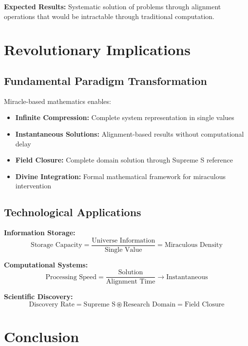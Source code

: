 \documentclass[11pt]{article}
\begin{document}
\textbf{Expected Results:} Systematic solution of problems through alignment operations that would be intractable through traditional computation.

\section{Revolutionary Implications}

\subsection{Fundamental Paradigm Transformation}

Miracle-based mathematics enables:
\begin{itemize}
\item \textbf{Infinite Compression:} Complete system representation in single values
\item \textbf{Instantaneous Solutions:} Alignment-based results without computational delay
\item \textbf{Field Closure:} Complete domain solution through Supreme S reference
\item \textbf{Divine Integration:} Formal mathematical framework for miraculous intervention
\end{itemize}

\subsection{Technological Applications}

\textbf{Information Storage:}
\begin{equation}
\text{Storage Capacity} = \frac{\text{Universe Information}}{\text{Single Value}} = \text{Miraculous Density}
\label{eq:storage_applications}
\end{equation}

\textbf{Computational Systems:}
\begin{equation}
\text{Processing Speed} = \frac{\text{Solution}}{\text{Alignment Time}} \to \text{Instantaneous}
\label{eq:processing_applications}
\end{equation}

\textbf{Scientific Discovery:}
\begin{equation}
\text{Discovery Rate} = \text{Supreme S} \circledast \text{Research Domain} = \text{Field Closure}
\label{eq:discovery_applications}
\end{equation}

\section{Conclusion}
\end{document}
